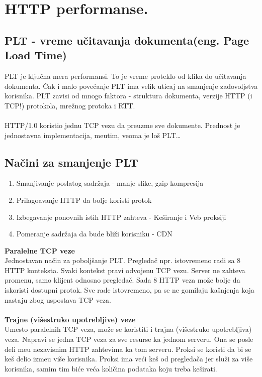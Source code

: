 \documentclass{article} %
\begin{document}
%
%

\section{HTTP performanse.}

\subsection{PLT - vreme u\v citavanja dokumenta(eng. Page Load Time)}

\noindent PLT je klju\v cna mera performansi. To je vreme proteklo od klika do u\v citavanja dokumenta. \v Cak i malo pove\' canje PLT ima velik uticaj na smanjenje zadovoljstva korisnika. PLT zavisi od mnogo faktora - struktura dokumenta, verzije HTTP (i TCP!) protokola, mre\v znog protoka i RTT.
\\
\\ HTTP/1.0 koristio jednu TCP vezu da preuzme sve dokumente. Prednost je jednostavna implementacija, me\dj utim, veoma je lo\v s PLT…

\subsection{Na\v cini za smanjenje PLT}

\begin{enumerate}
	\item Smanjivanje poslatog sadr\v zaja - manje slike, gzip kompresija
	\item Prilago\dj avanje HTTP da bolje koristi protok
	\item Izbegavanje ponovnih istih HTTP zahteva - Ke\v siranje i Veb proksiji
	\item Pomeranje sadr\v zaja da bude bli\v zi korisniku - CDN 
\end{enumerate}

\noindent\textbf{Paralelne TCP veze}
\\ Jednostavan na\v cin za pobolj\v sanje PLT. Pregleda\v c npr. istovremeno radi sa 8 HTTP konteksta. Svaki kontekst pravi odvojenu TCP vezu. Server ne zahteva promenu, samo klijent odnosno pregleda\v c. Sada 8 HTTP veza mo\v ze bolje da iskoristi dostupni protok. Sve rade istovremeno, pa se ne gomilaju ka\v snjenja koja nastaju zbog uspostava TCP veza.
\\
\\ \textbf{Trajne (vi\v sestruko upotrebljive) veze}
\\ Umesto paralelnih TCP veza, mo\v ze se koristiti i trajna (vi\v sestruko upotrebljiva) veza. Napravi se jedna TCP veza za sve resurse ka jednom serveru. Ona se posle deli me\dj u nezavisnim HTTP zahtevima ka tom serveru. Proksi se koristi da bi se ke\v s delio izme\dj u vi\v se korisnika. Proksi ima ve\' ci ke\v s od pregleda\v ca jer slu\v zi za vi\v se korisnika, samim tim bi\' ce ve\' ca koli\v cina podataka koju treba ke\v sirati.
\end{document}

